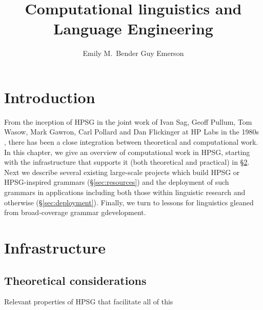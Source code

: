 \documentclass[output=paper]{langsci/langscibook}
\author{%
	Emily M.\ Bender\affiliation{University of Washington} \lastand
Guy Emerson\affiliation{Cambridge University}
}
\title{Computational linguistics and Language Engineering}
\begin{document}


\section{Introduction}


From the inception of HPSG in the joint work of Ivan Sag, Geoff Pullum, Tom Wasow, Mark Gawron, Carl Pollard and Dan Flickinger at HP Labs in the 1980s \cite{FIXME-CLobit-or-other}, there has been a close integration between theoretical and computational work. In this chapter, we give an overview of computational work in HPSG, starting with the infrastructure that supports it (both theoretical and practical) in \S\ref{sec:infrastructure}. Next we describe several existing large-scale projects which build HPSG or HPSG-inspired grammars (\S\ref{sec:resources}) and the deployment of such grammars in applications including both those within linguistic research and otherwise (\S\ref{sec:deployment}).  Finally, we turn to lessons for linguistics gleaned from broad-coverage grammar gdevelopment.


\section{Infrastructure}
\label{sec:infrastructure}


\subsection{Theoretical considerations}


Relevant properties of HPSG that facilitate all of this  %
\end{document}

